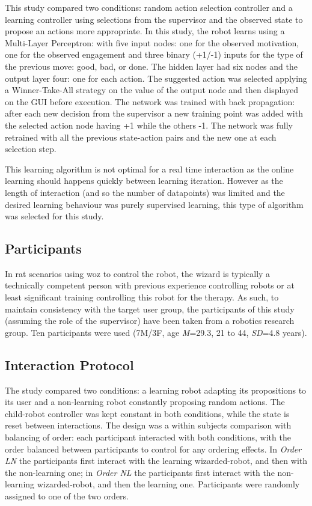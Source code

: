 This study compared two conditions: random action selection controller and a learning controller using selections from the supervisor and the observed state to propose an actions more appropriate. In this study, the robot learns using a Multi-Layer Perceptron: with five input nodes: one for the observed motivation, one for the observed engagement and three binary (+1/-1) inputs for the type of the previous move: good, bad, or done. The hidden layer had six nodes and the output layer four: one for each action. The suggested action was selected applying a Winner-Take-All strategy on the value of the output node and then displayed on the GUI before execution. The network was trained with back propagation: after each new decision from the supervisor a new training point was added with the selected action node having +1 while the others -1. The network was fully retrained with all the previous state-action pairs and the new one at each selection step. 

This learning algorithm is not optimal for a real time interaction as the online learning should happens quickly between learning iteration. However as the length of interaction (and so the number of datapoints) was limited and the desired learning behaviour was purely supervised learning, this type of algorithm was selected for this study.

\subsection{Participants}

In \gls{rat} scenarios using \gls{woz} to control the robot, the wizard is typically a technically competent person with previous experience controlling robots or at least significant training controlling this robot for the therapy. As such, to maintain consistency with the target user group, the participants of this study (assuming the role of the supervisor) have been taken from a robotics research group. Ten participants were used (7M/3F, age \textit{M}=29.3, 21 to 44, \textit{SD}=4.8 years).

\subsection{Interaction Protocol}

The study compared two conditions: a learning robot adapting its propositions to its user and a non-learning robot constantly proposing random actions. The child-robot controller was kept constant in both conditions, while the state is reset between interactions. The design was a within subjects comparison with balancing of order: each participant interacted with both conditions, with the order balanced between participants to control for any ordering effects. In \textit{Order LN} the participants first interact with the learning wizarded-robot, and then with the non-learning one; in \textit{Order NL} the participants first interact with the non-learning wizarded-robot, and then the learning one. Participants were randomly assigned to one of the two orders.

